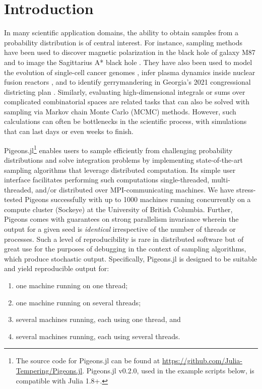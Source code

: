 \section{Introduction}
In many scientific application domains, the ability to obtain samples from a 
probability distribution is of central interest. 
For instance, sampling methods have been used to discover magnetic polarization 
in the black hole of galaxy M87 \cite{akiyama2021seven}
and to image the Sagittarius A* black hole \cite{akiyama2022first}.
They have also been used to 
model the evolution of single-cell cancer genomes \cite{salehi2021clonal}, 
infer plasma dynamics inside nuclear fusion reactors \cite{gota2021overview}, 
and to identify gerrymandering in Georgia's 2021 congressional districting plan 
\cite{zhao2022mathematically}.
Similarly, evaluating high-dimensional integrals or sums over complicated 
combinatorial spaces are related tasks that can also be solved with sampling 
via Markov chain Monte Carlo (MCMC) methods. 
However, such calculations can often be bottlenecks in the scientific process, with 
simulations that can last days or even weeks to finish. 


Pigeons.jl\footnote{The source code for Pigeons.jl can be found at 
\url{https://github.com/Julia-Tempering/Pigeons.jl}. 
Pigeons.jl v0.2.0, used in the example scripts below, is compatible with Julia 1.8+.}
enables users to sample efficiently from challenging probability distributions 
and solve integration problems by 
implementing state-of-the-art sampling algorithms \cite{syed2021nrpt,surjanovic2022vpt} 
that leverage distributed computation. Its simple user interface facilitates performing such computations 
single-threaded, multi-threaded, and/or distributed over MPI-communicating machines. 
We have stress-tested Pigeons successfully with up to 1000 machines running 
concurrently on a compute cluster (Sockeye) at the University of British Columbia.
Further, Pigeons comes with guarantees on strong parallelism invariance wherein 
the output for a given seed is \emph{identical} irrespective 
of the number of threads or processes. 
Such a level of reproducibility is rare in distributed software but of 
great use for the purposes of debugging in the context of sampling algorithms, 
which produce stochastic output.
Specifically, Pigeons.jl is designed to be suitable and yield reproducible output for:
\begin{enumerate}
    \item one machine running on one thread;
    \item one machine running on several threads;
    \item several machines running, each using one thread, and
    \item several machines running, each using several threads.
\end{enumerate}

